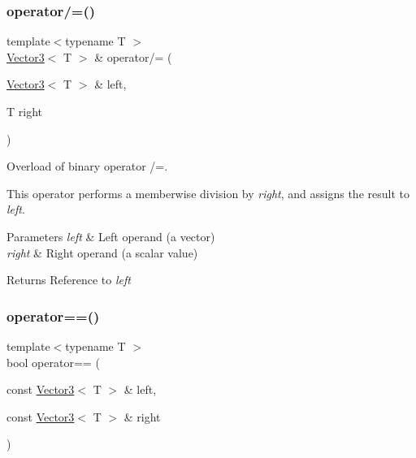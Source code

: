 \subsubsection{\texorpdfstring{operator/=()}{operator/=()}}
{\footnotesize\ttfamily template$<$typename T $>$ \\
\hyperlink{classsf_1_1_vector3}{Vector3}$<$ T $>$ \& operator/= (\begin{DoxyParamCaption}\item[{\hyperlink{classsf_1_1_vector3}{Vector3}$<$ T $>$ \&}]{left,  }\item[{T}]{right }\end{DoxyParamCaption})\hspace{0.3cm}{\ttfamily [related]}}



Overload of binary operator /=. 

This operator performs a memberwise division by {\itshape right}, and assigns the result to {\itshape left}.


\begin{DoxyParams}{Parameters}
{\em left} & Left operand (a vector) \\
\hline
{\em right} & Right operand (a scalar value)\\
\hline
\end{DoxyParams}
\begin{DoxyReturn}{Returns}
Reference to {\itshape left} 
\end{DoxyReturn}
\mbox{\label{classsf_1_1_vector3_a388d72db973306a35ba467016b3dee30}} 
\subsubsection{\texorpdfstring{operator==()}{operator==()}}
{\footnotesize\ttfamily template$<$typename T $>$ \\
bool operator== (\begin{DoxyParamCaption}\item[{const \hyperlink{classsf_1_1_vector3}{Vector3}$<$ T $>$ \&}]{left,  }\item[{const \hyperlink{classsf_1_1_vector3}{Vector3}$<$ T $>$ \&}]{right }\end{DoxyParamCaption})\hspace{0.3cm}{\ttfamily [related]}}



